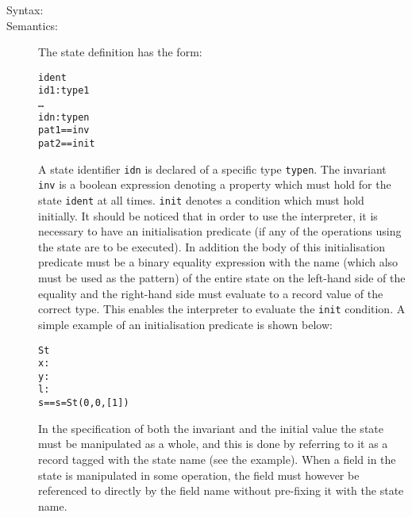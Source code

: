 \documentclass[\pformat,12pt]{article}
\begin{document}
\begin{description}
\item[Syntax:]




\item[Semantics:] The state definition has the form:
  \begin{alltt}
     ident 
      id1 : type1
      \ldots
      idn : typen
      pat1 == inv
     pat2 == init
  \end{alltt}
  A state identifier {\tt idn} is declared of a specific type {\tt typen}.
  The invariant {\tt inv} is a boolean expression denoting a
  property which must hold for the state {\tt ident} at all
  times. {\tt init} denotes a condition which must hold initially.
  It should be noticed that in order to use the
  interpreter, it is
  necessary to have an initialisation predicate (if any of the
  operations using the state are to be executed). In addition the body of
  this initialisation predicate must be a binary equality expression with
  the name (which also must be used as the pattern) of the entire state on
  the left-hand side of the equality and the right-hand side must evaluate
  to a record value of the correct type. This enables the interpreter
  to evaluate the {\tt init} condition. A simple example of an
  initialisation predicate is shown below:

  \begin{alltt}
   St 
    x:
    y:
    l:
   s == s = St(0,0,[1])
  \end{alltt}

  In the specification of both the invariant and the initial value the
  state must be manipulated as a whole, and this is done by referring to it
  as a record tagged with the state name (see the example). When a field in
  the state is manipulated in some operation, the field must however be
  referenced to directly by the field name without pre-fixing it with the
  state name.


\end{description}
\end{document}
